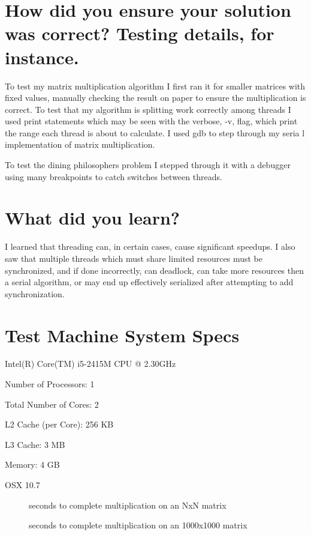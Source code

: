 \documentclass[letterpaper,10pt]{article} %
\begin{document}
\section{How did you ensure your solution was correct? Testing details, for instance.}


To test my matrix multiplication algorithm I first ran it for smaller matrices
with fixed values, manually checking the result on paper to ensure the multiplication
is correct. To test that my algorithm is splitting work correctly among threads I
used print statements which may be seen with the verbose, -v, flag, which print
the range each thread is about to calculate. I used gdb to step through my seria
l implementation of matrix multiplication.


To test the dining philosophers problem I stepped through it with a debugger
using many breakpoints to catch switches between threads.


\section{What did you learn?}


I learned that threading can, in certain cases, cause significant speedups.
I also saw that multiple threads which must share limited resources must be 
synchronized, and if done incorrectly, can deadlock, can take more resources
then a serial algorithm, or may end up effectively serialized after
attempting to add synchronization. 

\section{Test Machine System Specs}

Intel(R) Core(TM) i5-2415M CPU @ 2.30GHz 

Number of Processors: 1

Total Number of Cores: 2

L2 Cache (per Core): 256 KB

L3 Cache: 3 MB

Memory: 4 GB

OSX 10.7


\begin{figure}[p]
		\centering
		
		\caption{seconds to complete multiplication on an NxN matrix }
		\label{runtimes}
\end{figure}


\begin{figure}[p]
		\centering
		
		\caption{seconds to complete multiplication on an 1000x1000
		matrix}
		\label{runtimes}
\end{figure}
\end{document}

